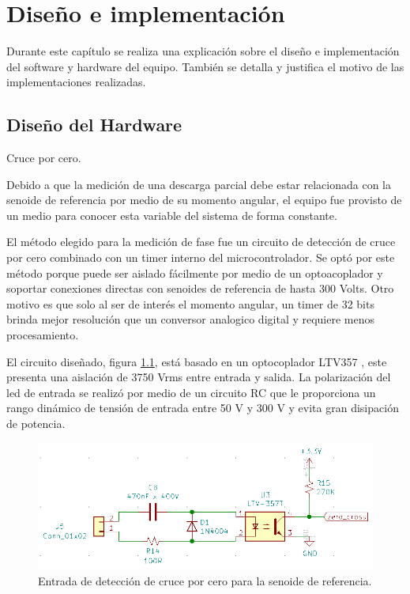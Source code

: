 \chapter{Diseño e implementación} %

\label{Chapter3} %
Durante este capítulo se realiza una explicación sobre el diseño e implementación del software y hardware del equipo. También se detalla y justifica el motivo de las implementaciones realizadas.

\section{Diseño del Hardware}
Cruce por cero.

Debido a que la medición de una descarga parcial debe estar relacionada con la senoide de referencia por medio de su momento angular, el equipo fue provisto de un medio para conocer esta variable del sistema de forma constante.

El método elegido para la medición de fase fue un circuito de detección de cruce por cero combinado con un timer interno del microcontrolador. Se optó por este método porque puede ser aislado fácilmente por medio de un optoacoplador y soportar conexiones directas con senoides de referencia de hasta 300 Volts. Otro motivo es que solo al ser de interés el momento angular, un timer de 32 bits brinda mejor resolución que un conversor analogico digital y requiere menos procesamiento.

El circuito diseñado, figura \ref{fig:schZeroCross}, está basado en un optocoplador LTV357 \citep{opto:ltv357}, este presenta una aislación de 3750 Vrms entre entrada y salida. La polarización del led de entrada se realizó por medio de un circuito RC que le proporciona un rango dinámico de tensión de entrada entre 50 V y 300 V y evita gran disipación de potencia. 

\begin{figure}[ht]
	\centering
	\includegraphics[width=130mm]{./Figures/schZeroCross.png}
	\caption{Entrada de detección de cruce por cero para la senoide de referencia.}
	\label{fig:schZeroCross}
\end{figure}

